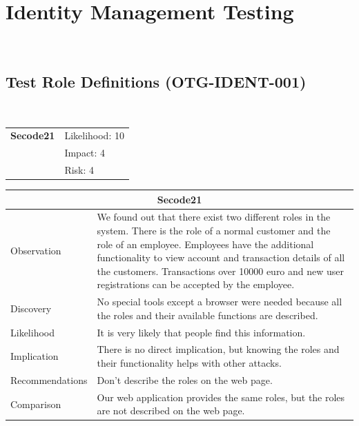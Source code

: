 \documentclass[headsepline,footsepline,footinclude=false,oneside,fontsize=11pt,paper=a4,listof=totoc,bibliography=totoc]{scrbook} %
\begin{document}
\pagebreak
\section{Identity Management Testing}\
\subsection{Test Role Definitions (OTG-IDENT-001)}\
\begin{tabular}{cR{12cm}}
	\textbf{Secode21} & Likelihood: 10\\& Impact: 4\\& Risk: 4
\end{tabular}

\begin{tabular}{ l|p{11cm}  }
	\hline
	\multicolumn{2}{c}{\textbf{Secode21}} \\
	\hline
	Observation   & We found out that there exist two different roles in the system. There is the role of a normal customer and the role of an employee. Employees have the additional functionality to view account and transaction details of all the customers. Transactions over 10000 euro and new user registrations can be accepted by the employee. \\
	Discovery  & No special tools except a browser were needed because all the roles and their available functions are described. \\
	Likelihood & It is very likely that people find this information. \\
	Implication    & There is no direct implication, but knowing the roles and their functionality helps with other attacks. \\
	Recommendations & Don't describe the roles on the web page. \\
	Comparison & Our web application provides the same roles, but the roles are not described on the web page. \\
	\hline
\end{tabular}
\\
\vspace{0.5cm}
\\
\end{document}
